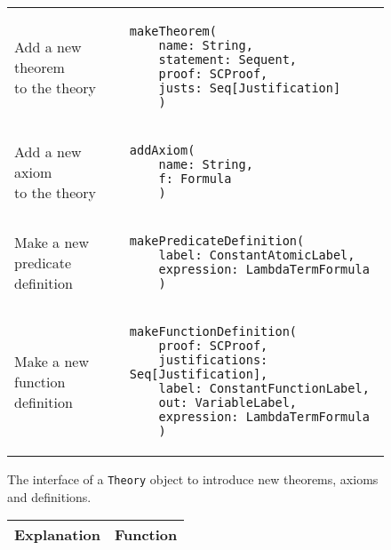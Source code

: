 {\begin{figure}[hp]
\begin{center}
\begin{tabular}{l|l}
          \makecell[l]{Add a new theorem \\to the theory} &
          \begin{lstlisting}[linewidth=19.5em]
  makeTheorem(
    name: String,
    statement: Sequent,
    proof: SCProof,
    justs: Seq[Justification]
    )
          \end{lstlisting}
          \\ %

          \makecell[l]{Add a new axiom   \\ to the theory} &
          \begin{lstlisting}[linewidth=19.5em]
  addAxiom(
    name: String,
    f: Formula
    )
          \end{lstlisting}
          \\ %

          \makecell[l]{Make a new        \\predicate definition} &
          \begin{lstlisting}[linewidth=19.5em]
  makePredicateDefinition(
    label: ConstantAtomicLabel,
    expression: LambdaTermFormula
    )
          \end{lstlisting}
          \\ %

          \makecell[l]{Make a new        \\function definition} &
          \begin{lstlisting}[linewidth=19.5em]
  makeFunctionDefinition(
    proof: SCProof,
    justifications: Seq[Justification],
    label: ConstantFunctionLabel,
    out: VariableLabel,
    expression: LambdaTermFormula
    )
          \end{lstlisting}
          \\ %
        \end{tabular}
        \caption{The interface of a \lstinline|Theory|{} object to introduce new theorems, axioms and definitions.}

        \label{fig:theorysetters}
      \end{center}
    \end{figure}







    \iffalse
      \begin{figure}[hp]
        \begin{center}
          \begin{tabular}{l|l}
            Explanation & Function
            \\ \hline


\end{tabular}
\end{center}
\end{figure}}

